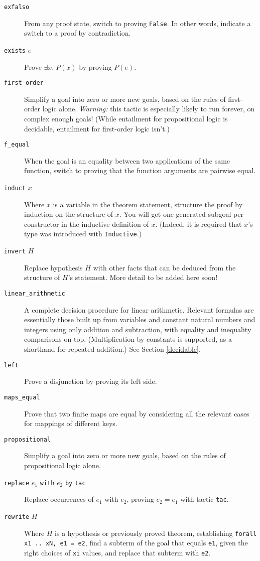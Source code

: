 \documentclass{amsbook}
\theoremstyle{definition}
\theoremstyle{remark}
\numberwithin{section}{chapter}
\numberwithin{equation}{chapter}
\begin{document}
\begin{description}
  \item[\texttt{exfalso}] From any proof state, switch to proving \texttt{False}.  In other words, indicate a switch to a proof by contradiction.
  \item[\texttt{exists} $e$] Prove $\exists x. \; P(x)$ by proving $P(e)$.
  \item[\texttt{first\_order}] Simplify a goal into zero or more new goals, based on the rules of first-order logic alone.  \emph{Warning:} this tactic is especially likely to run forever, on complex enough goals!  (While entailment for propositional logic is decidable, entailment for first-order logic isn't.)
  \item[\texttt{f\_equal}] When the goal is an equality between two applications of the same function, switch to proving that the function arguments are pairwise equal.
  \item[\texttt{induct} $x$] Where $x$ is a variable in the theorem statement, structure the proof by induction on the structure of $x$.  You will get one generated subgoal per constructor in the inductive definition of $x$.  (Indeed, it is required that $x$'s type was introduced with \texttt{Inductive}.)
  \item[\texttt{invert} $H$] Replace hypothesis $H$ with other facts that can be deduced from the structure of $H$'s statement.  More detail to be added here soon!
  \item[\texttt{linear\_arithmetic}] A complete decision procedure for linear arithmetic.  Relevant formulas are essentially those built up from variables and constant natural numbers and integers using only addition and subtraction, with equality and inequality comparisons on top.  (Multiplication by constants is supported, as a shorthand for repeated addition.) See Section \ref{decidable}.
  \item[\texttt{left}] Prove a disjunction by proving its left side.
  \item[\texttt{maps\_equal}] Prove that two finite maps are equal by considering all the relevant cases for mappings of different keys.
  \item[\texttt{propositional}] Simplify a goal into zero or more new goals, based on the rules of propositional logic alone.
  \item[\texttt{replace} $e_1$ \texttt{with} $e_2$ \texttt{by} \texttt{tac}] Replace occurrences of $e_1$ with $e_2$, proving $e_2 = e_1$ with tactic \texttt{tac}.
  \item[\texttt{rewrite} $H$] Where $H$ is a hypothesis or previously proved theorem, establishing \texttt{forall x1 .. xN, e1 = e2}, find a subterm of the goal that equals \texttt{e1}, given the right choices of \texttt{xi} values, and replace that subterm with \texttt{e2}.

\end{description}
\end{document}
